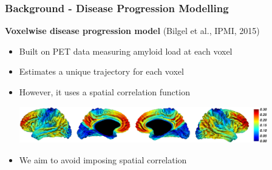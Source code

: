 \begin{frame}
\frametitle{Background - Disease Progression Modelling}

\newcommand{\mnpHeight}{3cm}

\vspace{-3em}
\textbf{Voxelwise disease progression model} (Bilgel et al., IPMI, 2015)
\begin{itemize}
  \item Built on PET data measuring amyloid load at each voxel
  \item Estimates a unique trajectory for each voxel
  \item However, it uses a spatial correlation function

  \vspace{2em}
  \includegraphics[width=0.85\textwidth]{bilgel_neuroimage}
  \vspace{2em}

  \item We aim to avoid imposing spatial correlation
  
  \end{itemize}



\end{frame}




\newcommand{\outFolder}{../overview/modelDiagram}
\newcommand{\lw}{0.5mm}

\newcommand{\yes}{{\LARGE \textcolor{green!50!black}{\checkmark} \par}}
\newcommand{\no}{{\LARGE \textcolor{red}{\xmark} \par}}


